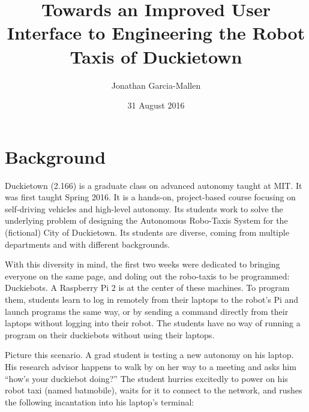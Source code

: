 \documentclass[titlepage]{article}
\title{Towards an Improved User Interface to Engineering the Robot Taxis of Duckietown}
\author{Jonathan Garcia-Mallen}
\date{31 August 2016}
\begin{document}
\lstset{language=Bash,
  numbers=left,
  stepnumber=3,    
  firstnumber=1,
  numberfirstline=true
}
\maketitle
\tableofcontents

\pagebreak

\section{Background } 
Duckietown (2.166) is a graduate class on advanced autonomy taught at MIT. It was first taught Spring 2016. It is a hands-on, project-based course focusing on self-driving vehicles and high-level autonomy. Its students work to solve the underlying problem of designing the Autonomous Robo-Taxis System for the (fictional) City of Duckietown. Its students are diverse, coming from multiple departments and with different backgrounds. 

With this diversity in mind, the first two weeks were dedicated to bringing everyone on the same page, and doling out the robo-taxis to be programmed: Duckiebots. 
A Raspberry Pi 2 
is at the center of these machines. To program them, students learn to log in remotely from their laptops to the robot's Pi and launch programs the same way, or by sending a command directly from their laptops without logging into their robot. The students have no way of running a program on their duckiebots without using their laptops.

Picture this scenario. A grad student is testing a new autonomy on his laptop. His research advisor happens to walk by on her way to a meeting and asks him ``how's your duckiebot doing?'' The student hurries excitedly to power on his robot taxi (named batmobile), waits for it to connect to the network, and rushes the following incantation into his laptop's terminal:
\end{document}
